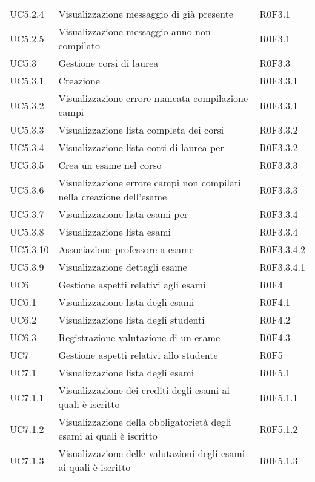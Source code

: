 \documentclass[AnalisiDeiRequisiti.tex]{subfiles}
\begin{document}
\begin{longtable}[H]{p{2cm}p{5cm}p{5cm}}
	UC5.2.4 & Visualizzazione messaggio di \citGloss{anno accademico} già presente & R0F3.1 \\  
	UC5.2.5 & Visualizzazione messaggio anno non compilato &  R0F3.1 \\  
	UC5.3 & Gestione corsi di laurea &  R0F3.3 \\   
	UC5.3.1 & Creazione \citGloss{corso di laurea} &  R0F3.3.1 \\  
	UC5.3.2 & Visualizzazione errore mancata compilazione campi & R0F3.3.1 \\  
	UC5.3.3 & Visualizzazione lista completa dei corsi &  R0F3.3.2 \\  
	UC5.3.4 & Visualizzazione lista corsi di laurea per \citGloss{anno accademico} & R0F3.3.2  \\  
	UC5.3.5 & Crea un esame nel corso &  R0F3.3.3\\  
	UC5.3.6 & Visualizzazione errore campi non compilati nella creazione dell'esame & R0F3.3.3  \\  
	UC5.3.7 & Visualizzazione lista esami per \citGloss{corso di laurea} & R0F3.3.4 \\  
	UC5.3.8 & Visualizzazione lista esami &  R0F3.3.4 \\  
	UC5.3.10 & Associazione professore a esame & R0F3.3.4.2 \\  
	UC5.3.9 & Visualizzazione dettagli esame & R0F3.3.4.1 \\  
	UC6 & Gestione aspetti relativi agli esami & R0F4 \\  
	UC6.1 & Visualizzazione lista degli esami & R0F4.1 \\  
	UC6.2 & Visualizzazione lista degli studenti & R0F4.2  \\  
	UC6.3 & Registrazione valutazione di un esame & R0F4.3 \\  
	UC7 & Gestione aspetti relativi allo studente & R0F5 \\  
	UC7.1 & Visualizzazione lista degli esami & R0F5.1 \\  
	UC7.1.1 & Visualizzazione dei crediti degli esami ai quali è iscritto & R0F5.1.1 \\  
	UC7.1.2 & Visualizzazione della obbligatorietà degli esami ai quali è iscritto & R0F5.1.2 \\  
	UC7.1.3 & Visualizzazione delle valutazioni degli esami ai quali è iscritto	& R0F5.1.3 \\  

\end{longtable}
\end{document}
